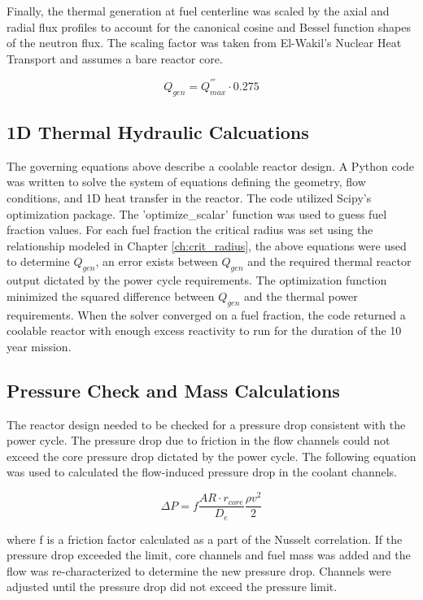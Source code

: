 Finally, the thermal generation at fuel centerline was scaled by the axial and
radial flux profiles to account for the canonical cosine and Bessel function
shapes of the neutron flux. The scaling factor was taken from
El-Wakil's Nuclear Heat Transport \citep{heat_trans_wakil} and assumes a 
bare reactor core.

\begin{equation}
    Q_{gen} = Q^{'''}_{max} \cdot 0.275
\end{equation}

\subsection{1D Thermal Hydraulic Calcuations}
The governing equations above describe a coolable
reactor design. A Python code was written to solve the system of equations
defining the geometry, flow conditions, and 1D heat transfer in the reactor. The
code utilized Scipy's optimization package. The 'optimize\_scalar' function was
used to guess fuel fraction values. For each fuel fraction the critical radius
was set using the relationship modeled in Chapter \ref{ch:crit_radius}, the above equations
were used to determine $Q_{gen}$, an error exists between $Q_{gen}$ and the
required thermal reactor output dictated by the power cycle requirements. The
optimization function minimized the squared difference between $Q_{gen}$ and the
thermal power requirements. When the solver converged on a fuel fraction, the
code returned a coolable reactor with enough excess reactivity to run for the
duration of the 10 year mission.

\subsection{Pressure Check and Mass Calculations}
The reactor design needed to be checked for a pressure drop consistent with the
power cycle. The pressure drop due to friction in the flow channels could not
exceed the core pressure drop dictated by the power cycle. The following
equation was used to calculated the flow-induced pressure drop in the coolant
channels.

\begin{equation}
    \Delta P = f \frac{AR\cdot r_{core}}{D_e} \frac{\rho v^2}{2}
\end{equation}

where f is a friction factor calculated as a part of the Nusselt correlation. If the
pressure drop exceeded the limit, core channels and fuel mass was added and the
flow was re-characterized to determine the new pressure drop. Channels were adjusted
until the pressure drop did not exceed the pressure limit.

